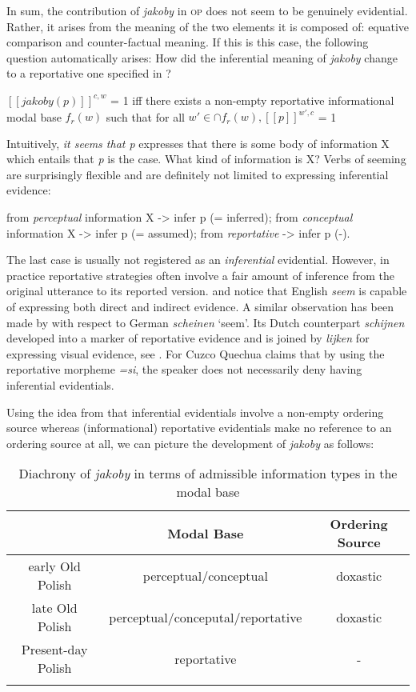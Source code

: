 \documentclass[output=paper
,modfonts
,nonflat]{langsci/langscibook}
\begin{document}
In sum, the contribution of \emph{jakoby} in \textsc{op} does not seem to be genuinely evidential. Rather, it arises from the meaning of the two elements it is composed of: equative comparison and counter-factual meaning. If this is this case, the following question automatically arises: How did the inferential meaning of \emph{jakoby} change to a reportative one specified in ? 

\ea	\([\![jakoby(p)]\!]^{c,w}\) = 1 iff there exists a non-empty reportative informational modal base \( f_{r}(w) \) such that for all \( w' \in \cap f_{r}(w), [[p]]^{w',c}\) = 1 \label{reportative}\z

\noindent Intuitively, \emph{it seems that p} expresses that there is some body of information X which entails that \emph{p} is the case. What kind of information is X? Verbs of seeming are surprisingly flexible and are definitely not limited to expressing inferential evidence:

\ea \ea from \emph{perceptual} information X -> infer p (= inferred);
	\ex	 from \emph{conceptual} information X -> infer p (= assumed);
	\ex	 from \emph{reportative} -> infer p (-).
\z
\z

\noindent The last case is usually not registered as an \emph{inferential} evidential. However, in practice reportative strategies often involve a fair amount of inference from the original utterance to its reported version. \textcite{Haan2007} and \textcite{Grimm2010} notice that English \emph{seem} is capable of expressing both direct and indirect evidence. A similar observation has been made by \textcite{Reis2007} with respect to German \emph{scheinen} `seem'. Its Dutch counterpart \emph{schijnen} developed into a marker of reportative evidence and is joined by \emph{lijken} for expressing visual evidence, see \textcite{Koring2013}. For Cuzco Quechua \textcite[53--55]{Faller2001} claims that by using the reportative morpheme \emph{=si}, the speaker does not necessarily deny having inferential evidentials.  

Using the idea from \textcite{Faller2011} that inferential evidentials involve a non-empty ordering source whereas (informational) reportative evidentials make no reference to an ordering source at all, we can picture the development of \emph{jakoby} as follows:

\begin{table}[h] 
\begin{tabular}{ccc} 
\lsptoprule
{} & Modal Base & Ordering Source \\
\midrule
early Old Polish & perceptual\slash conceptual & doxastic \\
late Old Polish & perceptual\slash conceputal\slash reportative & doxastic \\
Present-day Polish & reportative & - \\
\lspbottomrule
\end{tabular}
\caption{Diachrony of \emph{jakoby} in terms of admissible information types in the modal base}
\end{table}
\end{document}
